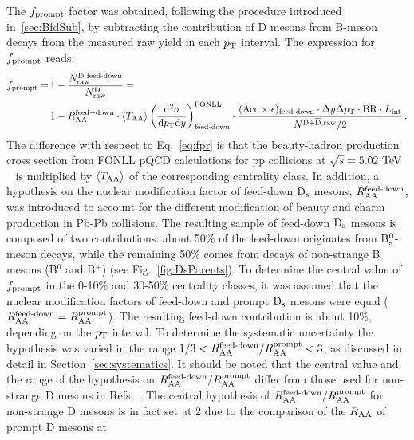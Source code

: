 The $f_{\rm prompt}$ factor was obtained, following the procedure 
introduced in~\ref{sec:BfdSub}, by subtracting the contribution of 
D mesons from B-meson decays from the measured raw yield 
in each $p_{\rm T}$ interval. The expression for $f_{\rm prompt}$ reads:
\begin{equation}
\label{eq:fprAA}
\begin{split}
f_{\mathrm{prompt}} = \, & 1- \frac{N^{\text{D~feed-down}}_{\mathrm{raw}}}{N^{\mathrm{D}}_{\mathrm{raw}}}=\\
& 1- R_{\rm AA} ^{\rm feed-down} \cdot  \langle T_{\rm AA} \rangle \left (\frac{\rm d^2 \sigma}{\mathrm dp_{\rm T} \mathrm d y} \right)^{\rm FONLL}_{\text{feed-down}} \cdot  \frac{(\mathrm{Acc} \times \epsilon)_\text{feed-down} \cdot \Delta y \Delta p_{\rm T} \cdot \mathrm{BR} \cdot L_{\rm int}}{N^{\rm D +\overline{D},raw}/2}\,.
\end{split}
\end{equation}
The difference with respect to Eq.~\ref{eq:fpr} is that the beauty-hadron 
production cross section from FONLL pQCD
calculations for pp collisions at $\sqrt{s}=5.02~\mathrm{TeV}$~\cite{Cacciari:2012ny}
is multiplied by $\langle T_{\rm AA} \rangle$ of the corresponding centrality class. 
In addition, a hypothesis on the nuclear 
modification factor of feed-down ${\rm D_s}$ mesons, $R_{\rm AA}^{\textnormal{feed-down}}$, was 
introduced to account for the different modification of beauty and charm 
production in Pb-Pb collisions. The resulting sample of 
feed-down ${\rm D_s}$ mesons is composed of two 
contributions: about 50\% of the feed-down originates from 
B$^0_{\rm s}$-meson decays, while the remaining 50\% comes from decays of 
non-strange B mesons (B$^0$ and B$^+$) (see Fig.~\ref{fig:DsParents}).
To determine the central value of $f_{\rm prompt}$ in the 0-10\% 
and 30-50\% centrality classes, it was assumed that the 
nuclear modification factors of feed-down and prompt ${\rm D_s}$ mesons were equal 
($R_{\rm AA}^{\textnormal{feed-down}}=R_{\rm AA}^{\rm prompt}$). 
The resulting feed-down contribution is about 10\%, depending on the
$p_{\rm T}$ interval.
To determine the systematic uncertainty the hypothesis
was varied in the range $1/3<R_{\rm AA}^{\textnormal{feed-down}}/R_{\rm AA}^{\rm prompt}<3$, as 
discussed in detail in Section~\ref{sec:systematics}.
It should be noted that the central value and the range of the hypothesis
on $R_{\rm AA}^{\textnormal{feed-down}}/R_{\rm AA}^{\rm prompt}$ differ from those used for
non-strange D mesons in Refs.~\cite{ALICE-PUBLIC-2017-003,Adam:2015sza}. The 
central hypothesis of $R_{\rm AA}^{\textnormal{feed-down}}/R_{\rm AA}^{\rm prompt}$ for non-strange
D mesons is in fact set at 2  due to the comparison of the $R_{\rm AA}$ of prompt D mesons at 
